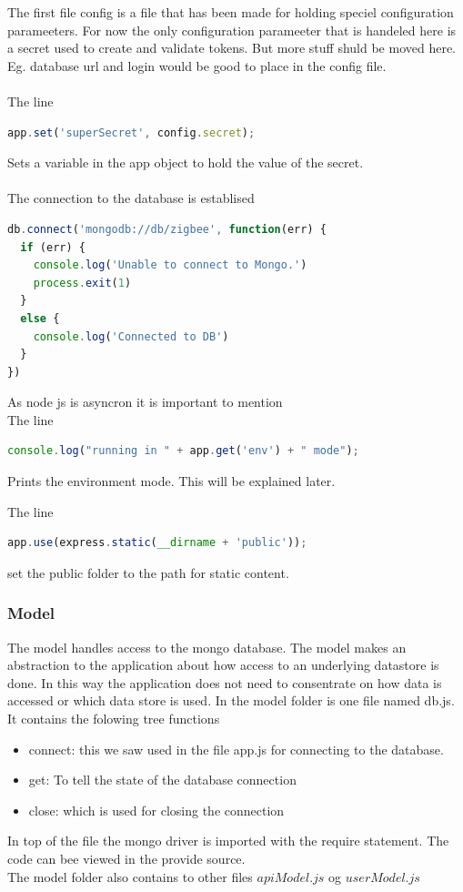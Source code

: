 \documentclass[a4paper,12pt,english]{article}
\begin{document}
The first file config is a file that has been made for holding speciel
configuration parameeters. For now the only configuration parameeter that is
handeled here is a secret used to create and validate tokens. But more stuff
shuld be moved here. Eg. database url and login would be good to place in the
config file.
\\
\\
The line
\begin{lstlisting}[language=javascript]
app.set('superSecret', config.secret); 
\end{lstlisting}
Sets a variable in the app object to hold the value of the secret.
\\\\
The connection to the database is establised
\begin{lstlisting}[language=javascript] 
db.connect('mongodb://db/zigbee', function(err) {
  if (err) {
    console.log('Unable to connect to Mongo.')
    process.exit(1)
  }
  else {
    console.log('Connected to DB')
  }
})
\end{lstlisting}
As node js is asyncron it is important to mention
 \\
The line
\begin{lstlisting}[language=javascript]
console.log("running in " + app.get('env') + " mode"); 
\end{lstlisting}
Prints the environment mode. This will be explained later.

The line
\begin{lstlisting}[language=javascript]
app.use(express.static(__dirname + 'public'));
\end{lstlisting}
set the public folder to the path for static content. 


\subsubsection{Model}
The model handles access to the mongo database. The model makes an abstraction to the application about how access to an underlying datastore is done. In this way the application does not need to consentrate on how data is accessed or which data store is used. In the model folder is one file named db.js. It contains the folowing tree functions
\begin{itemize}
\item connect: this we saw used in the file app.js for connecting to the database.
\item get: To tell the state of the database connection
\item  close: which is used for closing the connection
\end{itemize}
In top of the file the mongo driver is imported with the require statement.
The code can bee viewed in the provide source.
\\
The model folder also contains to  other files $apiModel.js$ og $userModel.js$
\end{document}
